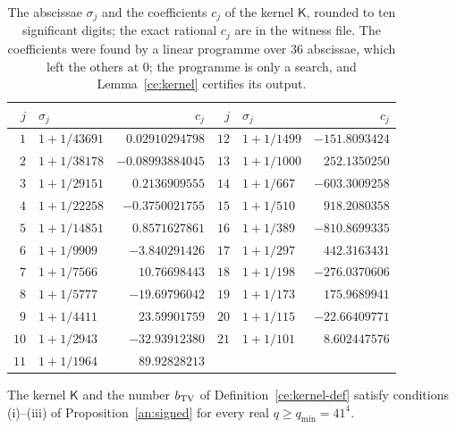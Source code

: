 \begin{table}[htbp]
\centering\footnotesize
\caption{The abscissae $\sigma_j$ and the coefficients $c_j$ of the kernel
$\mathsf K$, rounded to ten significant digits; the exact rational $c_j$ are
in the witness file. The coefficients were found by a linear programme over
$36$ abscissae, which left the others at $0$; the programme is only a
search, and Lemma~\ref{ce:kernel} certifies its output.}
\label{ce:kernel-table}
\begin{tabular}{rlr@{\qquad}rlr}
\toprule
$j$ & $\sigma_j$ & $c_j$ & $j$ & $\sigma_j$ & $c_j$\\
\midrule
$1$ & $1+1/43691$ & $0.02910294798$ & $12$ & $1+1/1499$ & $-151.8093424$\\
$2$ & $1+1/38178$ & $-0.08993884045$ & $13$ & $1+1/1000$ & $252.1350250$\\
$3$ & $1+1/29151$ & $0.2136909555$ & $14$ & $1+1/667$ & $-603.3009258$\\
$4$ & $1+1/22258$ & $-0.3750021755$ & $15$ & $1+1/510$ & $918.2080358$\\
$5$ & $1+1/14851$ & $0.8571627861$ & $16$ & $1+1/389$ & $-810.8699335$\\
$6$ & $1+1/9909$ & $-3.840291426$ & $17$ & $1+1/297$ & $442.3163431$\\
$7$ & $1+1/7566$ & $10.76698443$ & $18$ & $1+1/198$ & $-276.0370606$\\
$8$ & $1+1/5777$ & $-19.69796042$ & $19$ & $1+1/173$ & $175.9689941$\\
$9$ & $1+1/4411$ & $23.59901759$ & $20$ & $1+1/115$ & $-22.66409771$\\
$10$ & $1+1/2943$ & $-32.93912380$ & $21$ & $1+1/101$ & $8.602447576$\\
$11$ & $1+1/1964$ & $89.92828213$ & & &\\
\bottomrule
\end{tabular}
\end{table}

\begin{lemma}\label{ce:kernel}
The kernel $\mathsf K$ and the number $b_{\rm TV}$ of
Definition~\ref{ce:kernel-def} satisfy conditions (i)--(iii) of
Proposition~\ref{an:signed} for every real $q\ge q_{\min}=41^4$.
\end{lemma}

